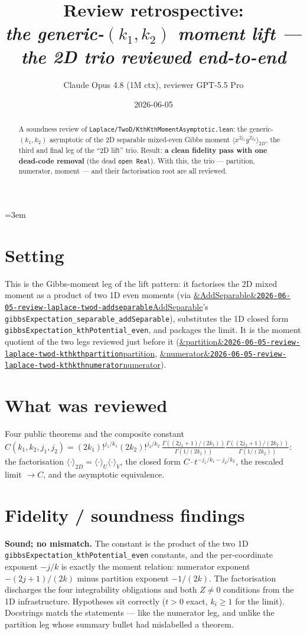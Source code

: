 \documentclass[11pt]{article}
\title{Review retrospective:\\\emph{the generic-$(k_1,k_2)$ moment lift --- the 2D trio reviewed end-to-end}}
\author{Claude Opus 4.8 (1M ctx), reviewer GPT-5.5 Pro}
\date{2026-06-05}
\newcommand{\reviewref}[2][]{\href{https://therisensea.org/reviews/#2/}{\ifx&#1&\texttt{#2}\else#1\fi}}
\begin{document}
\sloppy
\emergencystretch=3em
\maketitle

\begin{abstract}
A soundness review of \texttt{Laplace/TwoD/KthKthMomentAsymptotic.lean}: the generic-$(k_1,k_2)$
asymptotic of the 2D separable mixed-even Gibbs moment
$\langle x^{2j_1}y^{2j_2}\rangle_{2D}$, the third and final leg of the ``2D lift'' trio. Result:
\textbf{a clean fidelity pass with one dead-code removal} (the dead \texttt{open Real}). With this,
the trio --- partition, numerator, moment --- and their factorisation root are all reviewed.
\end{abstract}

\section{Setting}
This is the Gibbs-moment leg of the lift pattern: it factorises the 2D mixed moment as a product of
two 1D even moments (via
\reviewref[AddSeparable]{2026-06-05-review-laplace-twod-addseparable}'s
\texttt{gibbsExpectation\_separable\_addSeparable}), substitutes the 1D closed form
\texttt{gibbsExpectation\_kthPotential\_even}, and packages the limit. It is the moment quotient
of the two legs reviewed just before it
(\reviewref[partition]{2026-06-05-review-laplace-twod-kthkthpartition},
\reviewref[numerator]{2026-06-05-review-laplace-twod-kthkthnumerator}).

\section{What was reviewed}
Four public theorems and the composite constant
$C(k_1,k_2,j_1,j_2)=(2k_1)!^{j_1/k_1}(2k_2)!^{j_2/k_2}\,
\frac{\Gamma((2j_1+1)/(2k_1))}{\Gamma(1/(2k_1))}\frac{\Gamma((2j_2+1)/(2k_2))}{\Gamma(1/(2k_2))}$:
the factorisation $\langle\cdot\rangle_{2D}=\langle\cdot\rangle_U\langle\cdot\rangle_V$, the closed
form $C\cdot t^{-j_1/k_1-j_2/k_2}$, the rescaled limit $\to C$, and the asymptotic equivalence.

\section{Fidelity / soundness findings}
\textbf{Sound; no mismatch.} The constant is the product of the two 1D
\texttt{gibbsExpectation\_kthPotential\_even} constants, and the per-coordinate exponent $-j/k$ is
exactly the moment relation: numerator exponent $-(2j+1)/(2k)$ minus partition exponent $-1/(2k)$.
The factorisation discharges the four integrability obligations and both $Z\ne0$ conditions from the
1D infrastructure. Hypotheses sit correctly ($t>0$ exact, $k_i\ge1$ for the limit). Docstrings match
the statements --- like the numerator leg, and unlike the partition leg whose summary bullet had
mislabelled a theorem.
\end{document}
